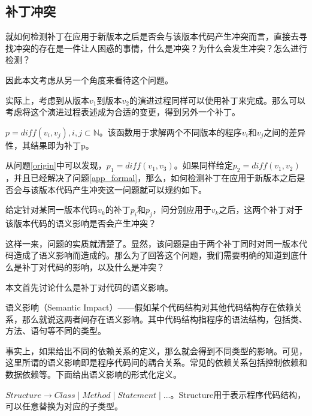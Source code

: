 \subsection{补丁冲突}

就如何检测补丁在应用于新版本之后是否会与该版本代码产生冲突而言，直接去寻找冲突的存在是一件让人困惑的事情，什么是冲突？为什么会发生冲突？怎么进行检测？

因此本文考虑从另一个角度来看待这个问题。

实际上，考虑到从版本$v_1$到版本$v_2$的演进过程同样可以使用补丁来完成。那么可以考虑将这个演进过程表述成为合适的变更，得到另外一个补丁。

\begin{definition}
	\label {define_diff}
	$p = diff(v_i,v_j),i,j \subset \mathbb{N}$。该函数用于求解两个不同版本的程序$v_i$和$v_j$之间的差异性，其结果即为补丁p。
\end{definition}

从问题\ref {origin}中可以发现，$p_{1} = diff(v_{1},v_{3})$。如果同样给定$p_{2} = diff(v_{1},v_{2})$，并且已经解决了问题\ref {app_formal}，那么，如何检测补丁在应用于新版本之后是否会与该版本代码产生冲突这一问题就可以规约如下。

\begin{problem}
	\label {compatible}
	给定针对某同一版本代码$v_k$的补丁$p_i$和$p_j$，问分别应用于$v_k$之后，这两个补丁对于该版本代码的语义影响是否会产生冲突？
\end{problem}

这样一来，问题的实质就清楚了。显然，该问题是由于两个补丁同时对同一版本代码造成了语义影响而造成的。那么为了回答这个问题，我们需要明确的知道到底什么是补丁对代码的影响，以及什么是冲突？

本文首先讨论什么是补丁对代码的语义影响。

\begin{definition}
	语义影响（Semantic Impact）——假如某个代码结构对其他代码结构存在依赖关系，那么就说这两者间存在语义影响。其中代码结构指程序的语法结构，包括类、方法、语句等不同的类型。
\end{definition}

事实上，如果给出不同的依赖关系的定义，那么就会得到不同类型的影响。可见，这里所谓的语义影响即是程序代码间的耦合关系。常见的依赖关系包括控制依赖和数据依赖等。下面给出语义影响的形式化定义。

\begin{definition}
	$Structure \to Class \mid Method \mid Statement \mid ...$。Structure用于表示程序代码结构，可以任意替换为对应的子类型。
\end{definition}

